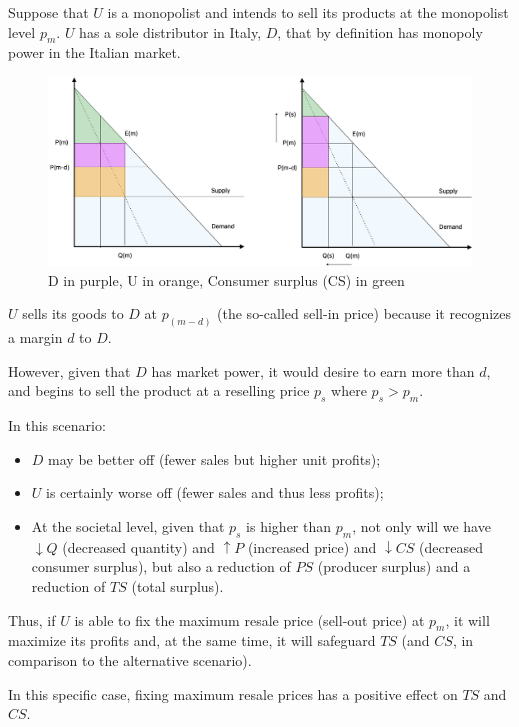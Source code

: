 \begin{enumerate}[label=(\alph*)]
            Suppose that $U$ is a monopolist and intends to sell its products at the monopolist level $p_m$. $U$ has a sole distributor in Italy, $D$, that by definition has monopoly power in the Italian market.

            \begin{figure}[ht]
                \centering
                \includegraphics[width=1\linewidth]{graphics/L9-1_double_marginalisation.png}
                \caption{D in purple, U in orange, Consumer surplus (CS) in green}
            \end{figure}
        
            $U$ sells its goods to $D$ at $p_{(m-d)}$ (the so-called sell-in price) because it recognizes a margin $d$ to $D$.
        
            However, given that $D$ has market power, it would desire to earn more than $d$, and begins to sell the product at a reselling price $p_s$ where $p_s > p_m$.
        
            In this scenario:
        
            \begin{itemize}
                \item $D$ may be better off (fewer sales but higher unit profits);
                \item $U$ is certainly worse off (fewer sales and thus less profits);
                \item At the societal level, given that $p_s$ is higher than $p_m$, not only will we have $\downarrow Q$ (decreased quantity) and $\uparrow P$ (increased price) and $\downarrow CS$ (decreased consumer surplus), but also a reduction of $PS$ (producer surplus) and a reduction of $TS$ (total surplus).
            \end{itemize}
        
            Thus, if $U$ is able to fix the maximum resale price (sell-out price) at $p_m$, it will maximize its profits and, at the same time, it will safeguard $TS$ (and $CS$, in comparison to the alternative scenario).
        
            In this specific case, fixing maximum resale prices has a positive effect on $TS$ and $CS$.
        \end{enumerate}


